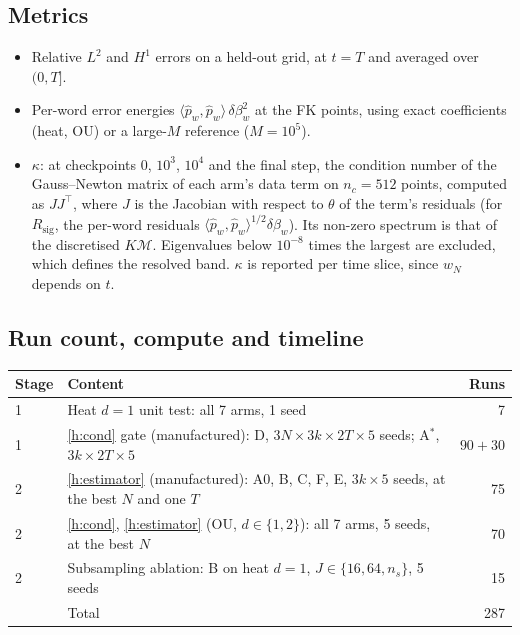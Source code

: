 \documentclass[english]{article}
\begin{document}
\subsection{Metrics}
\begin{itemize}[leftmargin=*]
  \item Relative $L^2$ and $H^1$ errors on a held-out grid, at $t=T$ and averaged over $(0,T]$.
  \item Per-word error energies $\langle\hat p_w,\hat p_w\rangle\,\delta\beta_w^2$ at the FK points, using exact coefficients (heat, OU) or a large-$M$ reference ($M=10^5$).
  \item $\kappa$: at checkpoints $0$, $10^3$, $10^4$ and the final step, the condition number of the Gauss--Newton matrix of each arm's data term on $n_c = 512$ points, computed as $JJ^\top$, where $J$ is the Jacobian with respect to $\theta$ of the term's residuals (for $R_\mathrm{sig}$, the per-word residuals $\langle\hat p_w,\hat p_w\rangle^{1/2}\delta\beta_w$). Its non-zero spectrum is that of the discretised $K\mathcal M$. Eigenvalues below $10^{-8}$ times the largest are excluded, which defines the resolved band. $\kappa$ is reported per time slice, since $w_N$ depends on $t$.
\end{itemize}


\subsection{Run count, compute and timeline}\label{sec:budget}
\begin{center}
\small
\begin{tabularx}{\textwidth}{@{}l X r@{}}
\toprule
Stage & Content & Runs \\
\midrule
1 & Heat $d=1$ unit test: all 7 arms, 1 seed & 7 \\
1 & \ref{h:cond} gate (manufactured): D, $3N\times3k\times2T\times5$ seeds; A$^*$, $3k\times2T\times5$ & $90+30$ \\
2 & \ref{h:estimator} (manufactured): A0, B, C, F, E, $3k\times5$ seeds, at the best $N$ and one $T$ & 75 \\
2 & \ref{h:cond}, \ref{h:estimator} (OU, $d\in\{1,2\}$): all 7 arms, 5 seeds, at the best $N$ & 70 \\
2 & Subsampling ablation: B on heat $d=1$, $J\in\{16,64,n_s\}$, 5 seeds & 15 \\
\midrule
& Total & 287 \\
\bottomrule
\end{tabularx}
\end{center}
\end{document}
